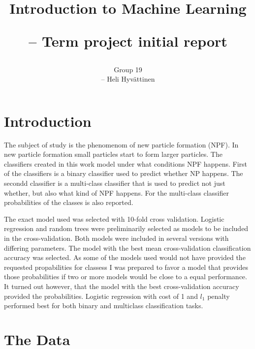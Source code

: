 \documentclass[a4size, 12pt]{report}
\begin{document}
	
	\author{Group 19 
		
		– Heli Hyvättinen}
	
	\title{Introduction to Machine Learning
		
		 – Term project initial report }
	
	\maketitle
	
	\section*{Introduction}
	
	The subject of study is the phenomenom of new particle formation (NPF). In new particle formation small particles start to form larger particles. The classifiers created in this work model under what conditions NPF happens. First of the classifiers is a binary classifier used to predict whether NP happens. The secondd classifier is a multi-class classifier that is used to predict not just whether, but also what kind of NPF happens. For the multi-class classifier probabilities of the classes is also reported.   %
	    
 
		The exact model used was selected with 10-fold cross validation.  Logistic regression and random trees were preliminarily selected as models to be included in the cross-validation. Both models were included in several versions with differing parameters. The model with the best mean cross-validation classification accuracy was selected. As some of the models used would not have provided the requested propabilities for classess I was prepared to favor a model that provides those probabilities if two or more models would be close to a equal performance. It turned out however, that the model with the best cross-validation accuracy provided the probabilities. Logistic regression with cost of 1 and $l_1$ penalty performed best for both binary and multiclass classification tasks.   

	
	\section*{The Data}
	
\end{document}

